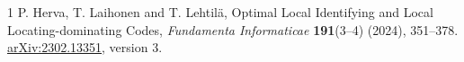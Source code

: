 \documentclass[11pt]{article}
\begin{document}
\begin{thebibliography}{1}
 P. Herva, T. Laihonen and T. Lehtil\"a,
Optimal Local Identifying and Local Locating-dominating Codes,
\emph{Fundamenta Informaticae} \textbf{191}(3--4) (2024), 351--378.
\href{https://arxiv.org/abs/2302.13351}{arXiv:2302.13351}, version 3.
\end{thebibliography}
\end{document}
